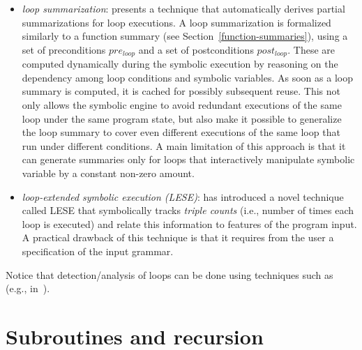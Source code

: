 \begin{itemize}
  \item {\em loop summarization}: \cite{GL-ISSTA11} presents a technique that automatically derives partial summarizations for loop executions. A loop summarization is formalized similarly to a function summary (see Section~\ref{function-summaries}), using a set of preconditions $pre_{loop}$ and a set of postconditions $post_{loop}$. These are computed dynamically during the symbolic execution by reasoning on the dependency among loop conditions and symbolic variables. As soon as a loop summary is computed, it is cached for possibly subsequent reuse. This not only allows the symbolic engine to avoid redundant executions of the same loop under the same program state, but also make it possible to generalize the loop summary to cover even different executions of the same loop that run under different conditions. A main limitation of this approach is that it can generate summaries only for loops that interactively manipulate symbolic variable by a constant non-zero amount.

  \item {\em loop-extended symbolic execution (LESE)}: \cite{SPM-ISSTA09} has introduced a novel technique called LESE that symbolically tracks {\em triple counts} (i.e., number of times each loop is executed) and relate this information to features of the program input. A practical drawback of this technique is that it requires from the user a specification of the input grammar. 

\end{itemize}

Notice that detection/analysis of loops can be done using techniques such as~\cite{SGL-TOPLAS96} (e.g., in~\cite{CFB-ACSAC06}).

\section{Subroutines and recursion}
\label{se:recursion}










